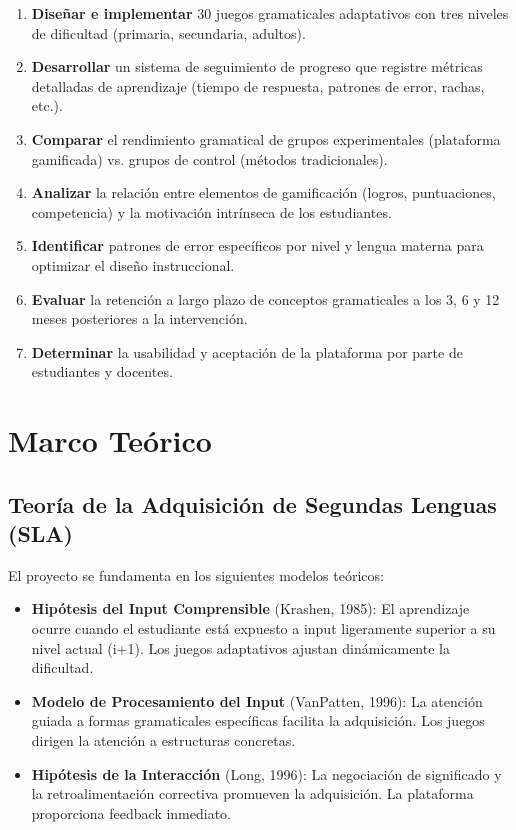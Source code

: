 \documentclass[12pt,a4paper]{article}
\begin{document}
\begin{enumerate}
    \item \textbf{Diseñar e implementar} 30 juegos gramaticales adaptativos con tres niveles de dificultad (primaria, secundaria, adultos).
    
    \item \textbf{Desarrollar} un sistema de seguimiento de progreso que registre métricas detalladas de aprendizaje (tiempo de respuesta, patrones de error, rachas, etc.).
    
    \item \textbf{Comparar} el rendimiento gramatical de grupos experimentales (plataforma gamificada) vs. grupos de control (métodos tradicionales).
    
    \item \textbf{Analizar} la relación entre elementos de gamificación (logros, puntuaciones, competencia) y la motivación intrínseca de los estudiantes.
    
    \item \textbf{Identificar} patrones de error específicos por nivel y lengua materna para optimizar el diseño instruccional.
    
    \item \textbf{Evaluar} la retención a largo plazo de conceptos gramaticales a los 3, 6 y 12 meses posteriores a la intervención.
    
    \item \textbf{Determinar} la usabilidad y aceptación de la plataforma por parte de estudiantes y docentes.
\end{enumerate}

\section{Marco Teórico}

\subsection{Teoría de la Adquisición de Segundas Lenguas (SLA)}

El proyecto se fundamenta en los siguientes modelos teóricos:

\begin{itemize}
    \item \textbf{Hipótesis del Input Comprensible} (Krashen, 1985): El aprendizaje ocurre cuando el estudiante está expuesto a input ligeramente superior a su nivel actual (i+1). Los juegos adaptativos ajustan dinámicamente la dificultad.
    
    \item \textbf{Modelo de Procesamiento del Input} (VanPatten, 1996): La atención guiada a formas gramaticales específicas facilita la adquisición. Los juegos dirigen la atención a estructuras concretas.
    
    \item \textbf{Hipótesis de la Interacción} (Long, 1996): La negociación de significado y la retroalimentación correctiva promueven la adquisición. La plataforma proporciona feedback inmediato.
\end{itemize}
\end{document}
